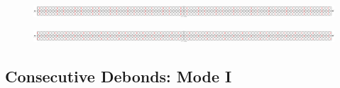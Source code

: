 \documentclass[first,firstsupp,lastsupp,last,hyperref,table]{ETHclass}
\begin{document}
\begin{frame}
\begin{columns}[c]
\begin{column}{0.5\textwidth}
\begin{figure}
\end{figure}
\end{column}
\end{columns}
\centering
\begin{figure}
\centering
\includegraphics[width=1.05\textwidth]{twofibers-sameside-crackshielding3.pdf}
\end{figure}
\vspace{-0.35cm}
\begin{figure}
\centering
\includegraphics[width=1.05\textwidth]{twofibers-oppositeside-crackshielding3.pdf}
\end{figure}
\end{frame}

\subsection{Consecutive Debonds: Mode I}
\end{document}
